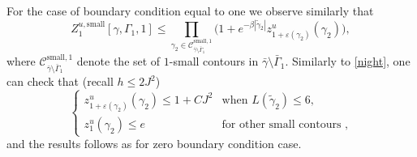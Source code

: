 \documentclass[10pt]{amsart}
\let\mathcal\mathscr
\numberwithin{equation}{section}
\theoremstyle{plain}
\theoremstyle{definition}
\newcommand{\sm}{\mathrm{small}}
\newcommand{\cC}{{\ensuremath{\mathcal C}} }
\newcommand{\gb}{\beta}
\newcommand{\gep}{\varepsilon}
\newcommand{\gG}{\Gamma}
\begin{document}
For the case of boundary condition equal to one we observe similarly that
\begin{equation*}
Z^{u,\sm}_{1}[\gamma,\gG_1,1]\le
\prod_{\gamma_2 \in \cC^{\sm,1}_{\bar \gamma\setminus \bar \gG_1}}
\bigl(1+ e^{-\gb |\tilde\gamma_2|}
z^u_{1+\gep(\gamma_2)}(\gamma_2) \bigr),
\end{equation*}
where $\cC^{\sm,1}_{\bar \gamma\setminus \bar \gG_1}$ denote the set of $1$-small contours in $\bar \gamma\setminus \bar \gG_1$.
Similarly to \eqref{night}, one can check that (recall $h\le 2J^2$)
\begin{equation*}%
\begin{cases}
z^u_{1+\gep(\gamma_2)}(\gamma_2)\le 1+CJ^2 &\text{when } L(\tilde\gamma_2)\le 6,\\
z^u_{1}(\gamma_2)\le e &\text{for other small contours },
\end{cases}
\end{equation*}
and the results follows as for zero boundary condition case.
\end{document}
